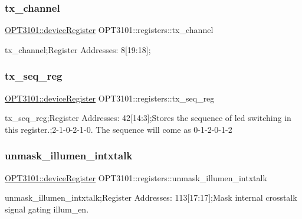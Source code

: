 \subsubsection{\texorpdfstring{tx\+\_\+channel}{tx\_channel}}
{\footnotesize\ttfamily \mbox{\hyperlink{class_o_p_t3101_1_1device_register}{O\+P\+T3101\+::device\+Register}} O\+P\+T3101\+::registers\+::tx\+\_\+channel}



tx\+\_\+channel;Register Addresses\+: 8\mbox{[}19\+:18\mbox{]}; 

\mbox{\label{class_o_p_t3101_1_1registers_a6cd0b1e1ec6febc0e4ec775e4c639d4c}} 
\subsubsection{\texorpdfstring{tx\+\_\+seq\+\_\+reg}{tx\_seq\_reg}}
{\footnotesize\ttfamily \mbox{\hyperlink{class_o_p_t3101_1_1device_register}{O\+P\+T3101\+::device\+Register}} O\+P\+T3101\+::registers\+::tx\+\_\+seq\+\_\+reg}



tx\+\_\+seq\+\_\+reg;Register Addresses\+: 42\mbox{[}14\+:3\mbox{]};Stores the sequence of led switching in this register.;2-\/1-\/0-\/2-\/1-\/0. The sequence will come as 0-\/1-\/2-\/0-\/1-\/2 

\mbox{\label{class_o_p_t3101_1_1registers_a08f87e1e66f332f99a6410f1c3ddd845}} 
\subsubsection{\texorpdfstring{unmask\+\_\+illumen\+\_\+intxtalk}{unmask\_illumen\_intxtalk}}
{\footnotesize\ttfamily \mbox{\hyperlink{class_o_p_t3101_1_1device_register}{O\+P\+T3101\+::device\+Register}} O\+P\+T3101\+::registers\+::unmask\+\_\+illumen\+\_\+intxtalk}



unmask\+\_\+illumen\+\_\+intxtalk;Register Addresses\+: 113\mbox{[}17\+:17\mbox{]};Mask internal crosstalk signal gating illum\+\_\+en. 

